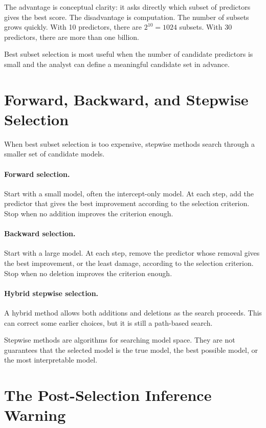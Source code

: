 The advantage is conceptual clarity: it asks directly which subset of predictors gives the best score.  The disadvantage is computation.  The number of subsets grows quickly.  With 10 predictors, there are \(2^{10}=1024\) subsets.  With 30 predictors, there are more than one billion.

Best subset selection is most useful when the number of candidate predictors is small and the analyst can define a meaningful candidate set in advance.

\section{Forward, Backward, and Stepwise Selection}

When best subset selection is too expensive, stepwise methods search through a smaller set of candidate models.

\paragraph{Forward selection.}
Start with a small model, often the intercept-only model.  At each step, add the predictor that gives the best improvement according to the selection criterion.  Stop when no addition improves the criterion enough.

\paragraph{Backward selection.}
Start with a large model.  At each step, remove the predictor whose removal gives the best improvement, or the least damage, according to the selection criterion.  Stop when no deletion improves the criterion enough.

\paragraph{Hybrid stepwise selection.}
A hybrid method allows both additions and deletions as the search proceeds.  This can correct some earlier choices, but it is still a path-based search.

Stepwise methods are algorithms for searching model space.  They are not guarantees that the selected model is the true model, the best possible model, or the most interpretable model.

\section{The Post-Selection Inference Warning}

